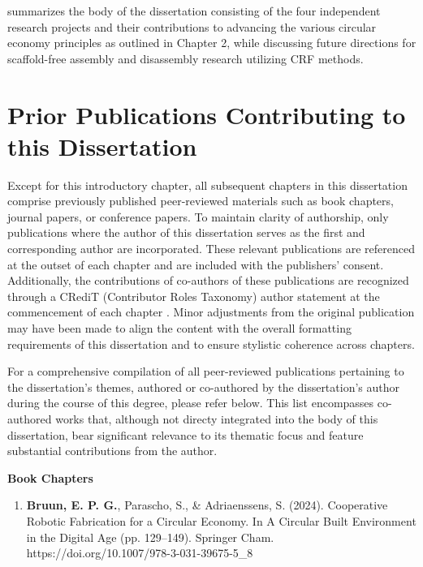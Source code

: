      summarizes the body of the dissertation consisting of the four independent research projects and their contributions to advancing the various circular economy principles as outlined in Chapter 2, while discussing future directions for scaffold-free assembly and disassembly research utilizing CRF methods.



\section{Prior Publications Contributing to this Dissertation}
    Except for this introductory chapter, all subsequent chapters in this dissertation comprise previously published peer-reviewed materials such as book chapters, journal papers, or conference papers. To maintain clarity of authorship, only publications where the author of this dissertation serves as the first and corresponding author are incorporated. These relevant publications are referenced at the outset of each chapter and are included with the publishers' consent. Additionally, the contributions of co-authors of these publications are recognized through a CRediT (Contributor Roles Taxonomy) author statement at the commencement of each chapter \citep{allen_how_2019}. Minor adjustments from the original publication may have been made to align the content with the overall formatting requirements of this dissertation and to ensure stylistic coherence across chapters.
    
    For a comprehensive compilation of all peer-reviewed publications pertaining to the dissertation's themes, authored or co-authored by the dissertation's author during the course of this degree, please refer below. This list encompasses co-authored works that, although not directy integrated into the body of this dissertation, bear significant relevance to its thematic focus and feature substantial contributions from the author.
    
    \vspace{0.5cm}
    \noindent\textbf{Book Chapters}
    \begin{enumerate} [topsep=0pt]
        \item \textbf{Bruun, E. P. G.}, Parascho, S., \& Adriaenssens, S. (2024). Cooperative Robotic Fabrication for a Circular Economy. In A Circular Built Environment in the Digital Age (pp. 129–149). Springer Cham. https://doi.org/10.1007/978-3-031-39675-5\_8
    \end{enumerate}

